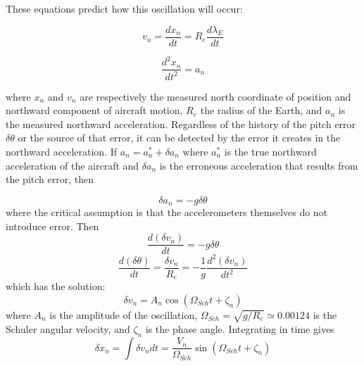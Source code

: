 \documentclass[12pt,twoside,english]{article}\usepackage[]{graphicx}\usepackage[]{color}
\let\OrgIndex\index
\renewcommand*{\index}[1]{\OrgIndex{#1}}
\begin{document}
{{These equations predict how this oscillation will occur: 

\begin{equation}
v_{n}=\frac{dx_{n}}{dt}=R_{e}\frac{d\lambda_E}{dt}\label{eq:vn} 
\end{equation}


\begin{equation}
\frac{d^{2}x_{n}}{dt^{2}}=a_{n}\label{eq:an}
\end{equation}


where $x_{n}$ and $v_n$ are respectively the measured north coordinate of position and
northward component of aircraft motion, $R_e$ the radius of the Earth, and $a_{n}$ is the measured northward acceleration. Regardless of the history of the pitch error $\delta\theta$ or the source of that error, it can be detected by the error it creates in the northward acceleration. If $a_{n}=a_{n}^{*}+\delta a_{n}$ where $a_{n}^{*}$ is the true northward acceleration of the aircraft and $\delta a_{n}$ is the erroneous acceleration that results from the pitch error, then 

\begin{equation}
\delta a_{n}=-g\delta\theta\label{eq:delta-an} 
\end{equation}
where the critical assumption is that the accelerometers themselves do not introduce error. Then\\ 
\begin{equation}
\frac{d(\delta v_{n})}{dt}=-g\delta\theta\label{eq:delta-vn-dot}
\end{equation}
\begin{equation}
\frac{d(\delta\theta)}{dt}=\frac{\delta v_{n}}{R_{e}}=-\frac{1}{g}\frac{d^{2}(\delta v_{n})}{dt^{2}}\label{eq:delta-theta-dot}
\end{equation}
which has the solution:\\ 
\begin{equation}
\delta v_{n}=A_{n}\cos(\Omega_{Sch}t+\zeta_{n})\label{eq:delta-vn-solution} 
\end{equation}
where $A_{n}$ 
is the amplitude of the oscillation, $\Omega_{Sch}=\sqrt{g/R_{e}}\simeq0.00124$
is the Schuler angular
velocity, and $\zeta_n$ is the phase angle. Integrating in time gives\\ 
\begin{equation}
\delta x_{n}=\int\delta v_{n}dt=\frac{V_{n}}{\Omega_{Sch}}\sin(\Omega_{Sch}t+\zeta_{n})\label{eq:delta-xn-solution} 
\end{equation}

}}
\end{document}
